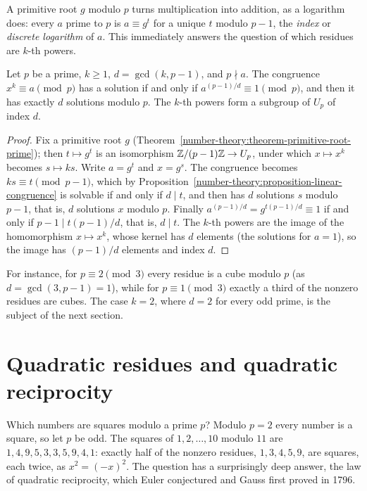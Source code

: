 A primitive root $g$ modulo $p$ turns multiplication into addition, as a logarithm does: every $a$ prime to $p$ is $a \equiv g^t$ for a unique $t$ modulo $p - 1$, the \emph{index} or \emph{discrete
logarithm} of $a$. This immediately answers the question of which residues are $k$-th powers.

\begin{proposition}\label{number-theory:proposition-power-residues}
Let $p$ be a prime, $k \geq 1$, $d = \gcd(k, p - 1)$, and $p \nmid a$. The congruence $x^k \equiv a \pmod p$ has a solution if and only if $a^{(p-1)/d} \equiv 1 \pmod p$, and then it has exactly $d$ solutions
modulo $p$. The $k$-th powers form a subgroup of $U_p$ of index $d$.
\end{proposition}

\begin{proof}
Fix a primitive root $g$ (Theorem~\ref{number-theory:theorem-primitive-root-prime}); then $t \mapsto g^t$ is an isomorphism $\mathbb{Z}/(p - 1)\mathbb{Z} \to U_p$, under which $x \mapsto x^k$ becomes
$s \mapsto ks$. Write $a = g^t$ and $x = g^s$. The congruence becomes $ks \equiv t \pmod{p - 1}$, which by Proposition~\ref{number-theory:proposition-linear-congruence} is solvable if and only if $d \mid t$,
and then has $d$ solutions $s$ modulo $p - 1$, that is, $d$ solutions $x$ modulo $p$. Finally $a^{(p-1)/d} = g^{t(p-1)/d} \equiv 1$ if and only if $p - 1 \mid t(p - 1)/d$, that is, $d \mid t$. The $k$-th
powers are the image of the homomorphism $x \mapsto x^k$, whose kernel has $d$ elements (the solutions for $a = 1$), so the image has $(p - 1)/d$ elements and index $d$.
\end{proof}

For instance, for $p \equiv 2 \pmod 3$ every residue is a cube modulo $p$ (as $d = \gcd(3, p - 1) = 1$), while for $p \equiv 1 \pmod 3$ exactly a third of the nonzero residues are cubes. The case $k = 2$,
where $d = 2$ for every odd prime, is the subject of the next section.

\section{Quadratic residues and quadratic reciprocity}\label{number-theory:section-quadratic}

Which numbers are squares modulo a prime $p$? Modulo $p = 2$ every number is a square, so let $p$ be odd. The squares of $1, 2, \ldots, 10$ modulo $11$ are $1, 4, 9, 5, 3, 3, 5, 9, 4, 1$: exactly half of the
nonzero residues, $1, 3, 4, 5, 9$, are squares, each twice, as $x^2 = (-x)^2$. The question has a surprisingly deep answer, the law of quadratic reciprocity, which Euler conjectured and Gauss first proved
in 1796.

